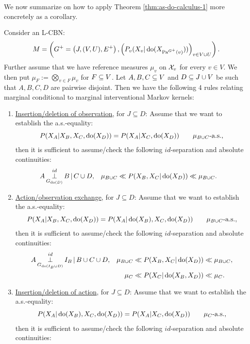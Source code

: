 We now summarize on how to apply Theorem \ref{thm:as-do-calculus-1} more concretely as a corollary.
\begin{Cor}
    \label{cor:as-do-calculus-2}
        Consider an L-CBN:
    \[M= \left ( G^+=\left ( J,(V,U),E^+ \right ), \left ( P_v ( X_v|\operatorname{do}( X_{\mathrm{Pa}^{G^+}(v)})) \right )_{v \in V \cup U} \right ).\]
    Further assume that we have %
    reference measures $\mu_v$ on $\mathcal{X}_v$ for every $v \in V$.
    We then put $\mu_F := \bigotimes_{v \in F} \mu_v$ for $F \subseteq V$.
    Let $A,B,C \subseteq V$ and $D \subseteq J \cup V$ be such that $A,B,C,D$ are pairwise disjoint.
    Then we have the following 4 rules relating marginal conditional to marginal interventional Markov kernels:
    \begin{enumerate}
        \item \underline{Insertion/deletion of observation}, for $J \subseteq D$:
            Assume that we want to establish the a.s.-equality:
            \[ P(X_A|X_B,X_C,\operatorname{do}(X_{D})) = P(X_A|X_C,\operatorname{do}(X_{D})) \qquad \mu_{B \cup C}\text{-a.s.}, \]
         then it is sufficient to assume/check the following $id$-separation and absolute continuities:
         \begin{align*} 
             A &\operatorname*{\perp}^{id}_{G_{\operatorname{do}(D)}} B \operatorname*{|} C \cup D, &
             \mu_{B \cup C} &\ll P(X_B,X_C|\operatorname{do}(X_{D}))\ll \mu_{B \cup C}.
         \end{align*}
     \item \underline{Action/observation exchange}, for $J \subseteq D$: 
         Assume that we want to establish the a.s.-equality:
         \[ P(X_A|X_B,X_C,\operatorname{do}(X_{D}))  = P(X_A|\operatorname{do}(X_B),X_C,\operatorname{do}(X_{D})) 
         \qquad \mu_{B \cup C}\text{-a.s.}, \]
         then it is sufficient to assume/check the following $id$-separation and absolute continuities:
         \begin{align*} 
             A & \operatorname*{\perp}^{id}_{G_{\operatorname{do}(I_B\cup D)}} I_B \operatorname*{|} B \cup C \cup D, &          
                    \mu_{B \cup C} &\ll  P(X_B,X_C|\operatorname{do}(X_{D})) \ll \mu_{B \cup C},\\
                 &&   \mu_C &\ll  P(X_C|\operatorname{do}(X_B,X_{D})) \ll \mu_C.
         \end{align*}
     \item \underline{Insertion/deletion of action}, for $J \subseteq D$: 
         Assume that we want to establish the a.s.-equality:
         \[ P(X_A|\operatorname{do}(X_B),X_C,\operatorname{do}(X_{D})) = P(X_A|X_C,\operatorname{do}(X_{D})) \qquad \mu_C\text{-a.s.}, \]
          then it is sufficient to assume/check the following $id$-separation and absolute continuities:

\end{enumerate}
\end{Cor}
